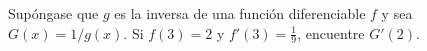 \item Supóngase que $g$ es la inversa de una función diferenciable $f$ y sea $G(x) = 1/g(x)$. Si $f(3) = 2$ y $f'(3) = \frac{1}{9}$, encuentre $G'(2)$.
